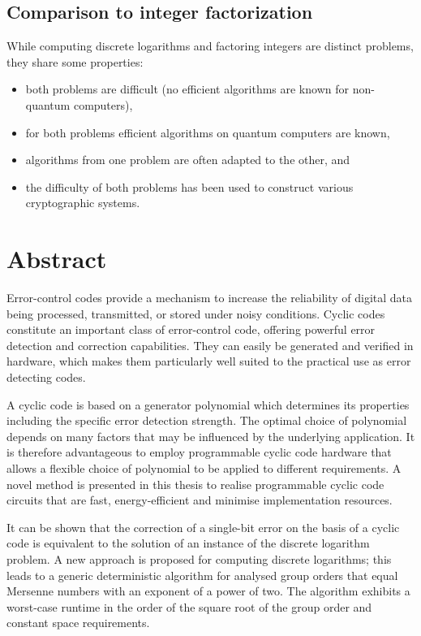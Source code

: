 \documentclass[oneside, a4paper, 11pt]{memoir}
\begin{document}
\subsection{Comparison to integer factorization}
While computing discrete logarithms and factoring integers are distinct problems, they share some properties:

\begin{itemize}
	\setlength{\itemsep}{-2pt}
	\item both problems are difficult (no efficient algorithms are known for non-quantum computers),
	\item for both problems efficient algorithms on quantum computers are known,
	\item algorithms from one problem are often adapted to the other, and
	\item the difficulty of both problems has been used to construct various cryptographic systems.
\end{itemize}

\section{Abstract}
Error-control codes provide a mechanism to increase the reliability of digital data being processed, transmitted, or stored under noisy conditions. Cyclic codes constitute an important class of error-control code, offering powerful error detection and correction capabilities. They can easily be generated and verified in hardware, which makes them particularly well suited to the practical use as error detecting codes.

A cyclic code is based on a generator polynomial which determines its properties including the specific error detection strength. The optimal choice of polynomial depends on many factors that may be influenced by the underlying application. It is therefore advantageous to employ programmable cyclic code hardware that allows a flexible choice of polynomial to be applied to different requirements. A novel method is presented in this thesis to realise programmable cyclic code circuits that are fast, energy-efficient and minimise implementation resources.

It can be shown that the correction of a single-bit error on the basis of a cyclic code is equivalent to the solution of an instance of the discrete logarithm problem. A new approach is proposed for computing discrete logarithms; this leads to a generic deterministic algorithm for analysed group orders that equal Mersenne numbers with an exponent of a power of two. The algorithm exhibits a worst-case runtime in the order of the square root of the group order and constant space requirements.
\end{document}
